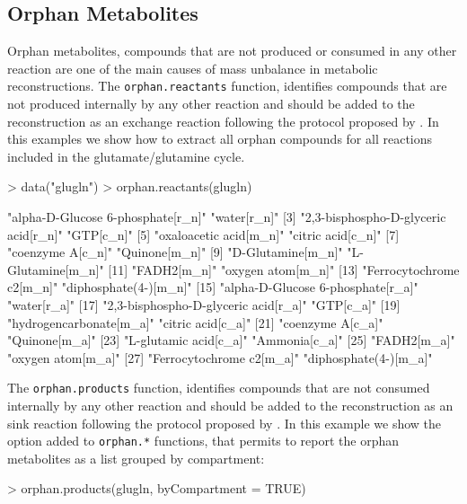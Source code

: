 \subsection{Orphan Metabolites}
Orphan metabolites, compounds that are not produced or consumed in any other reaction are one of the main causes of mass unbalance in metabolic reconstructions. The \texttt{orphan.reactants} function, identifies compounds that are not produced internally by any other reaction and should be added to the reconstruction as an exchange reaction following the protocol proposed by \cite{Thiele2010}.  In this examples we show how to extract all orphan compounds for all reactions included in the glutamate/glutamine cycle.
\begin{Schunk}
\begin{Sinput}
> data("glugln")
> orphan.reactants(glugln)
\end{Sinput}
\begin{Soutput}
 [1] "alpha-D-Glucose 6-phosphate[r_n]"    "water[r_n]"                         
 [3] "2,3-bisphospho-D-glyceric acid[r_n]" "GTP[c_n]"                           
 [5] "oxaloacetic acid[m_n]"               "citric acid[c_n]"                   
 [7] "coenzyme A[c_n]"                     "Quinone[m_n]"                       
 [9] "D-Glutamine[m_n]"                    "L-Glutamine[m_n]"                   
[11] "FADH2[m_n]"                          "oxygen atom[m_n]"                   
[13] "Ferrocytochrome c2[m_n]"             "diphosphate(4-)[m_n]"               
[15] "alpha-D-Glucose 6-phosphate[r_a]"    "water[r_a]"                         
[17] "2,3-bisphospho-D-glyceric acid[r_a]" "GTP[c_a]"                           
[19] "hydrogencarbonate[m_a]"              "citric acid[c_a]"                   
[21] "coenzyme A[c_a]"                     "Quinone[m_a]"                       
[23] "L-glutamic acid[c_a]"                "Ammonia[c_a]"                       
[25] "FADH2[m_a]"                          "oxygen atom[m_a]"                   
[27] "Ferrocytochrome c2[m_a]"             "diphosphate(4-)[m_a]"               
\end{Soutput}
The \texttt{orphan.products} function, identifies compounds that are not consumed internally by any other reaction and should be added to the reconstruction as an sink reaction following the protocol proposed by \cite{Thiele2010}. In this example we show the option added to \texttt{orphan.*} functions, that permits to report the orphan metabolites as a list grouped by compartment:
\begin{Sinput}
> orphan.products(glugln, byCompartment = TRUE)
\end{Sinput}
\end{Schunk}
